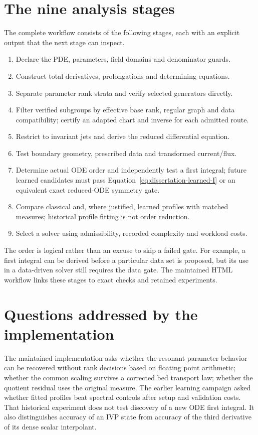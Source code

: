 \documentclass[12pt,a4paper,oneside]{report}
\numberwithin{equation}{chapter}
\begin{document}
\section{The nine analysis stages}
The complete workflow consists of the following stages, each with an explicit
output that the next stage can inspect.
\begin{enumerate}
\item Declare the PDE, parameters, field domains and denominator guards.
\item Construct total derivatives, prolongations and determining equations.
\item Separate parameter rank strata and verify selected generators directly.
\item Filter verified subgroups by effective base rank, regular graph and data
compatibility; certify an adapted chart and inverse for each admitted route.
\item Restrict to invariant jets and derive the reduced differential equation.
\item Test boundary geometry, prescribed data and transformed current/flux.
\item Determine actual ODE order and independently test a first integral;
future learned candidates must pass Equation~\eqref{eq:dissertation-learned-I}
or an equivalent exact reduced-ODE symmetry gate.
\item Compare classical and, where justified, learned profiles with matched
measures; historical profile fitting is not order reduction.
\item Select a solver using admissibility, recorded complexity and workload costs.
\end{enumerate}
The order is logical rather than an excuse to skip a failed gate. For example,
a first integral can be derived before a particular data set is proposed, but
its use in a data-driven solver still requires the data gate. The maintained
HTML workflow links these stages to exact checks and retained experiments.

\section{Questions addressed by the implementation}
The maintained implementation asks whether the resonant parameter behavior can be
recovered without rank decisions based on floating point arithmetic; whether
the common scaling survives a corrected bed transport law; whether the
quotient residual uses the original measure. The earlier learning campaign
asked whether fitted profiles beat spectral controls after setup and
validation costs. That historical experiment does not test discovery of a
new ODE first integral. It also distinguishes accuracy of an IVP state from
accuracy of the third derivative of its dense scalar interpolant.
\end{document}
